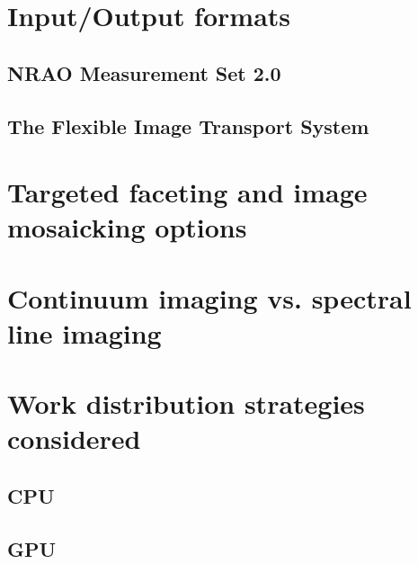 \section{Input/Output formats}
\subsection{NRAO Measurement Set 2.0}
\subsection{The Flexible Image Transport System}
\section{Targeted faceting and image mosaicking options}
\section{Continuum imaging vs. spectral line imaging}
\section{Work distribution strategies considered}
\subsection{CPU}
\subsection{GPU}